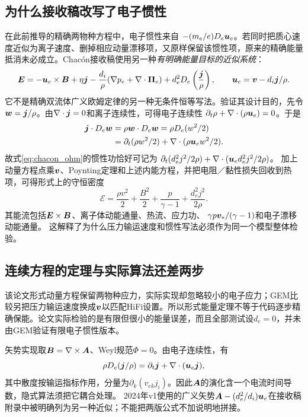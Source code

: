 \subsection{为什么接收稿改写了电子惯性}
在此前推导的精确两物种方程中，电子惯性来自
$-(m_e/e)D_e\bm{u}_e$。若同时把质心速度近似为离子速度、删掉相应动量漂移项，又原样保留该惯性项，原来的精确能量抵消未必成立。Chacón接收稿使用另一种\emph{有明确能量目标的近似系统}：
\begin{equation}
 \bm{E}=-\bm{u}_e\times\bm{B}+\eta\bm{j}
 -\frac{d_i}{\rho}(\nabla p_e+\nabla\cdot\bm{\Pi}_e)
 +d_e^2D_e\left(\frac{\bm{j}}{\rho}\right),
 \qquad \bm{u}_e=\bm{v}-d_i\bm{j}/\rho.
 \label{eq:chacon_ohm}
\end{equation}
它不是精确双流体广义欧姆定律的另一种无条件恒等写法。验证其设计目的，先令$\bm{w}=\bm{j}/\rho$。由$\nabla\cdot\bm{j}=0$和离子连续性，可得电子连续性
$\partial_t\rho+\nabla\cdot(\rho\bm{u}_e)=0$。于是
\begin{align}
 \bm{j}\cdot D_e\bm{w}
 &=\rho\bm{w}\cdot D_e\bm{w}=\rho D_e(w^2/2)\nonumber\\
 &=\partial_t(\rho w^2/2)+\nabla\cdot(\rho\bm{u}_e w^2/2).
 \label{eq:current_energy}
\end{align}
故式\eqref{eq:chacon_ohm}的惯性功恰好可记为
$\partial_t(d_e^2j^2/2\rho)+\nabla\cdot(\bm{u}_e d_e^2j^2/2\rho)$。
加上动量方程点乘$\bm{v}$、Poynting定理和上述内能方程，并把电阻／黏性损失回收到热项，可得形式上的守恒密度
\begin{equation}
 \mathcal E=\frac{\rho v^2}{2}+\frac{B^2}{2}
 +\frac{p}{\gamma-1}+\frac{d_e^2j^2}{2\rho}.
\end{equation}
其能流包括$\bm{E}\times\bm{B}$、离子体动能通量、热流、应力功、
$\gamma p\bm{v}_*/(\gamma-1)$和电子漂移动能通量。
这解释了为什么压力输运速度和惯性写法必须作为同一个模型整体检验。

\subsection{连续方程的定理与实际算法还差两步}
该论文形式动量方程保留两物种应力，实际实现却忽略较小的电子应力；GEM比较另把压力输运速度换成$\bm{v}$以匹配HiFi设置。所以形式能量定理不等于代码逐步精确保能。论文实际检验的是有限但很小的能量误差，而且全部测试设$d_e=0$，并未由GEM验证有限电子惯性版本。

矢势实现取$\bm{B}=\nabla\times\bm{A}$、Weyl规范$\Phi=0$。由电子连续性，有
\begin{equation}
 \rho D_e(\bm{j}/\rho)=\partial_t\bm{j}
 +\nabla\cdot(\bm{u}_e\bm{j}),
\end{equation}
其中散度按输运指标作用，分量为$\partial_k(v_{ek}j_i)$。因此$\bm{A}$的演化含一个电流时间导数，隐式算法须把它耦合处理。
2024年v1使用的广义矢势$\bm{A}-(d_e^2/d_i)\bm{u}_e$在接收稿附录中被明确列为另一种近似；不能把两版公式不加说明地拼接。


